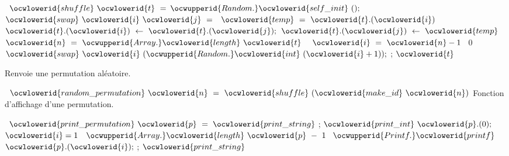 \documentclass[12pt]{article}
\begin{document}
\ocweol
\label{Permutation.ml:5879}%
\medskip
\ocwbegincode{}\ocwindent{0.00em}
~$\ocwlowerid{shuffle}~\ocwlowerid{t}~=$\ocweol
\ocwindent{1.00em}
$\ocwupperid{Random.}\ocwlowerid{self\_init}~();$\ocweol
\ocwindent{1.00em}
~$\ocwlowerid{swap}~\ocwlowerid{i}~\ocwlowerid{j}~=~$~$\ocwlowerid{temp}~=~\ocwlowerid{t}.(\ocwlowerid{i})~$\ocweol
\ocwindent{8.50em}
$\ocwlowerid{t}.(\ocwlowerid{i})~\leftarrow{}~\ocwlowerid{t}.(\ocwlowerid{j});$\ocweol
\ocwindent{8.50em}
$\ocwlowerid{t}.(\ocwlowerid{j})~\leftarrow{}~\ocwlowerid{temp}$\ocweol
\ocwindent{1.00em}
\ocweol
\ocwindent{1.00em}
~$\ocwlowerid{n}~=~\ocwupperid{Array.}\ocwlowerid{length}~\ocwlowerid{t}~$\ocweol
\ocwindent{1.00em}
~$\ocwlowerid{i}~=~\ocwlowerid{n}-1~$~0~\ocweol
\ocwindent{2.00em}
$\ocwlowerid{swap}~\ocwlowerid{i}~(\ocwupperid{Random.}\ocwlowerid{int}~(\ocwlowerid{i}+1));$\ocweol
\ocwindent{1.00em}
;\ocweol
\ocwindent{1.00em}
$\ocwlowerid{t}$\medskip

\ocwendcode{}\ocwindent{0.00em}
Renvoie une permutation aléatoire.

\ocweol
\label{Permutation.ml:6152}%
\medskip
\ocwbegincode{}\ocwindent{0.00em}
~$\ocwlowerid{random\_permutation}~\ocwlowerid{n}~=~\ocwlowerid{shuffle}~(\ocwlowerid{make\_id}~\ocwlowerid{n})$\ocweol
\ocwendcode{}\allowbreak\ocwsection
\label{Permutation.ml:6204}%
Fonction d'affichage d'une permutation.

\ocweol
\label{Permutation.ml:6249}%
\medskip
\ocwbegincode{}\ocwindent{0.00em}
~$\ocwlowerid{print\_permutation}~\ocwlowerid{p}~=$\ocweol
\ocwindent{1.00em}
$\ocwlowerid{print\_string}~$\ocwstring{"["};\ocweol
\ocwindent{1.00em}
$\ocwlowerid{print\_int}~\ocwlowerid{p}.(0);$\ocweol
\ocwindent{1.00em}
~$\ocwlowerid{i}=1~$~$\ocwupperid{Array.}\ocwlowerid{length}~\ocwlowerid{p}~-~1~$\ocweol
\ocwindent{2.00em}
$\ocwupperid{Printf.}\ocwlowerid{printf}~$~$\ocwlowerid{p}.(\ocwlowerid{i});$\ocweol
\ocwindent{1.00em}
;\ocweol
\ocwindent{1.00em}
$\ocwlowerid{print\_string}~$\ocwstring{"]"}\ocweol
\ocwendcode{}
\end{document}
